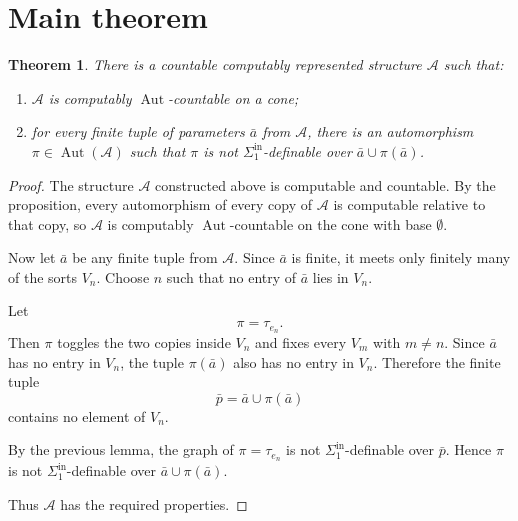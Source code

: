 \documentclass[11pt]{article}
\newtheorem{theorem}{Theorem}
\newcommand{\Aut}{\operatorname{Aut}}
\begin{document}
\section*{Main theorem}

\begin{theorem}
There is a countable computably represented structure $\mathcal A$ such that:
\begin{enumerate}
\item $\mathcal A$ is computably $\Aut$-countable on a cone;
\item for every finite tuple of parameters $\bar a$ from $\mathcal A$, there is an automorphism $\pi\in\Aut(\mathcal A)$ such that $\pi$ is not
$\Sigma^{\mathrm{in}}_1$-definable over $\bar a\cup\pi(\bar a)$.
\end{enumerate}
\end{theorem}

\begin{proof}
The structure $\mathcal A$ constructed above is computable and countable.  By the proposition, every automorphism of every copy of $\mathcal A$ is computable relative to that copy, so $\mathcal A$ is computably $\Aut$-countable on the cone with base $\emptyset$.

Now let $\bar a$ be any finite tuple from $\mathcal A$.  Since $\bar a$ is finite, it meets only finitely many of the sorts $V_n$.  Choose $n$ such that no entry of $\bar a$ lies in $V_n$.

Let
\[
\pi=\tau_{e_n}.
\]
Then $\pi$ toggles the two copies inside $V_n$ and fixes every $V_m$ with $m\neq n$.  Since $\bar a$ has no entry in $V_n$, the tuple $\pi(\bar a)$ also has no entry in $V_n$.  Therefore the finite tuple
\[
\bar p=\bar a\cup\pi(\bar a)
\]
contains no element of $V_n$.

By the previous lemma, the graph of $\pi=\tau_{e_n}$ is not
$\Sigma^{\mathrm{in}}_1$-definable over $\bar p$.  Hence $\pi$ is not
$\Sigma^{\mathrm{in}}_1$-definable over $\bar a\cup\pi(\bar a)$.

Thus $\mathcal A$ has the required properties.
\end{proof}
\end{document}
